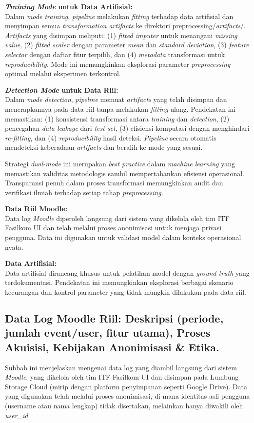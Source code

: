 \textbf{\textit{Training Mode} untuk Data Artifisial:} \\
Dalam \textit{mode training}, \textit{pipeline} melakukan \textit{fitting} terhadap data artifisial dan menyimpan semua \textit{transformation artifacts} ke direktori preprocessing/\textit{artifacts}/. \textit{Artifacts} yang disimpan meliputi: (1) \textit{fitted imputer} untuk menangani \textit{missing value}, (2) \textit{fitted scaler} dengan parameter \textit{mean} dan \textit{standard deviation}, (3) \textit{feature selector} dengan daftar fitur terpilih, dan (4) \textit{metadata} transformasi untuk \textit{reproducibility}. Mode ini memungkinkan eksplorasi parameter \textit{preprocessing} optimal melalui eksperimen terkontrol.

\textbf{\textit{Detection Mode} untuk Data Riil:} \\
Dalam \textit{mode detection}, \textit{pipeline} memuat \textit{artifacts} yang telah disimpan dan menerapkannya pada data riil tanpa melakukan \textit{fitting} ulang. Pendekatan ini memastikan: (1) konsistensi transformasi antara \textit{training} dan \textit{detection}, (2) pencegahan \textit{data leakage} dari \textit{test set}, (3) efisiensi komputasi dengan menghindari \textit{re-fitting}, dan (4) \textit{reproducibility} hasil deteksi. \textit{Pipeline} secara otomatis mendeteksi keberadaan \textit{artifacts} dan beralih ke mode yang sesuai.

Strategi \textit{dual-mode} ini merupakan \textit{best practice} dalam \textit{machine learning} yang memastikan validitas metodologis sambil mempertahankan efisiensi operasional. Transparansi penuh dalam proses transformasi memungkinkan audit dan verifikasi ilmiah terhadap setiap tahap \textit{preprocessing}.

\textbf{Data Riil Moodle:} \\
Data log \textit{Moodle} diperoleh langsung dari sistem yang dikelola oleh tim ITF Fasilkom UI dan telah melalui proses anonimisasi untuk menjaga privasi pengguna. Data ini digunakan untuk validasi model dalam konteks operasional nyata.

\textbf{Data Artifisial:} \\
Data artifisial dirancang khusus untuk pelatihan model dengan \textit{ground truth} yang terdokumentasi. Pendekatan ini memungkinkan eksplorasi berbagai skenario kecurangan dan kontrol parameter yang tidak mungkin dilakukan pada data riil.

\subsection{Data Log Moodle Riil: Deskripsi (periode, jumlah event/user, fitur utama), Proses Akuisisi, Kebijakan Anonimisasi \& Etika.}
\label{sec:logRiil}
Subbab ini menjelaskan mengenai data log yang diambil langsung dari sistem \textit{Moodle}, yang dikelola oleh tim ITF Fasilkom UI dan disimpan pada Lumbung Storage Cloud (mirip dengan platform penyimpanan seperti Google Drive). Data yang digunakan telah melalui proses anonimisasi, di mana identitas asli pengguna (username atau nama lengkap) tidak disertakan, melainkan hanya diwakili oleh \textit{user\_id}.

